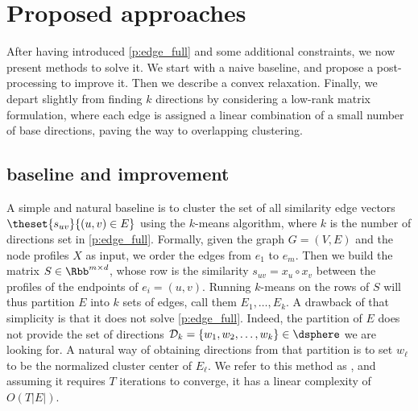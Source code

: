 \section{Proposed approaches}
\label{sec:edge_methods}

After having introduced \autoref{p:edge_full} and some additional constraints, we now present
methods to solve it. We start with a naive baseline, and propose a post-processing to improve it.
Then we describe a convex relaxation. Finally, we depart slightly from finding $k$ directions by
considering a low-rank matrix formulation, where each edge is assigned a linear combination of a
small number of base directions, paving the way to overlapping clustering.

\subsection{\kmeans{} baseline and improvement}
\label{sub:edge_baseline}

A simple and natural baseline is to cluster the set of all similarity edge vectors $
\theset{s_{uv}}{(u,v) \in E}$ using the $k$-means algorithm, where $k$ is the number of directions
set in \autoref{p:edge_full}. Formally, given the graph $G=(V,E)$ and the node profiles $X$ as
input, we order the edges from $e_1$ to $e_m$. Then we build the matrix $S \in \Rbb^{m\times d}$, whose
\ith{} row is the similarity $s_{uv} = x_u \circ x_v$ between the profiles of the endpoints of $e_i=(u,v)$.
Running $k$-means on the rows of $S$ will thus partition $E$ into $k$ sets of edges, call them $E_1,
\ldots, E_k$. A drawback of that simplicity is that it does not solve \autoref{p:edge_full}.
Indeed, the partition of $E$ does not provide the set of directions $\mathcal{D}_k = \{w_1, w_2,
\ldots, w_k\} \in \dsphere$ we are looking for. A natural way of obtaining directions from that
partition is to set $w_\ell$ to be the normalized cluster center of $E_\ell$. We refer to this
method as \kmeans{}, and assuming it requires $T$ iterations to converge, it has a linear complexity
of $O(T|E|)$.
\iffalse
\begin{center}
  \rule{\textwidth}{.3pt}
  \begin{algorithmic}[1]
    \Function{\kmeans{}}{graph $G=(V,E=\{e_1, \ldots, e_m \})$, profiles $X$}
    \State build the matrix $S$ such that $S_{i,j} = {s_{e_i}}_{;j}$
    \State let $\yhat{}$ and $\{c_1, \ldots, c_k\}$ be the assignment and centroids resulting of
    running $k$-means on the rows of $S$
    \State \textbf{return} \yhat{}, $\mathcal{D}_k = \left\{\frac{c_\ell}{\left\| c_\ell
    \right\|}\right\}_{\ell=1}^k $
    \EndFunction
  \end{algorithmic}
  \rule{\textwidth}{.3pt}
\end{center}
\fi

